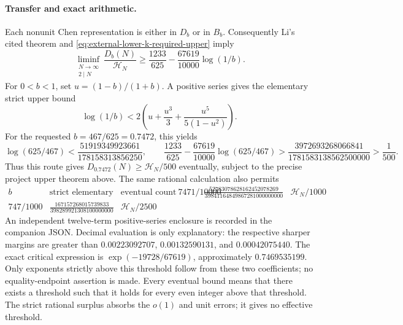 \paragraph{Transfer and exact arithmetic.}
Each nonunit Chen representation is either in $D_b$ or in $B_b$.
Consequently Li's cited theorem and
\eqref{eq:external-lower-k-required-upper} imply
\begin{equation}\label{eq:external-lower-k-transfer}
 \liminf_{\substack{N\to\infty\\2\mid N}}
 \frac{D_b(N)}{\mathcal H_N}
 \ge \frac{1233}{625}-\frac{67619}{10000}\log(1/b).
\end{equation}
For $0<b<1$, set $u=(1-b)/(1+b)$. A positive series gives the elementary
strict upper bound
\[
 \log(1/b)<2\left(u+\frac{u^3}{3}
                     +\frac{u^5}{5(1-u^2)}\right).
\]
For the requested $b=467/625=0.7472$, this yields
\[
 \log(625/467)<\frac{51919349923661}{178158313856250},
 \qquad
 \frac{1233}{625}-\frac{67619}{10000}\log(625/467)
 >\frac{3972693268066841}{1781583138562500000}>\frac1{500}.
\]
Thus this route gives $D_{0.7472}(N)\ge\mathcal H_N/500$ eventually,
subject to the precise project upper theorem above.
The same rational calculation also permits
\[
 \begin{array}{c|c|c}
 b&\text{strict elementary lower margin}&\text{eventual count}\ \hline
 7471/10000&
 \displaystyle\frac{52783078628162452078269}
 {39841164849867281000000000}&\mathcal H_N/1000\\[4pt]
 747/1000&
 \displaystyle\frac{167157268015739833}
 {398289921308100000000}&\mathcal H_N/2500
 \end{array}
\]
An independent twelve-term positive-series enclosure is recorded in the
companion JSON. Decimal evaluation is only explanatory:
the respective sharper margins are greater than
$0.00223092707$, $0.00132590131$, and $0.00042075440$.
The exact critical expression is
$\exp(-19728/67619)$, approximately $0.7469535199$.
Only exponents strictly above this threshold follow from these two
coefficients; no equality-endpoint assertion is made.
Every eventual bound means that there exists a threshold such that it
holds for every even integer above that threshold. The strict rational
surplus absorbs the $o(1)$ and unit errors; it gives no effective threshold.

